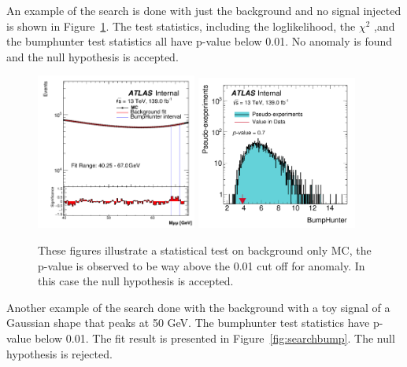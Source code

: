 An example of the search is done with just the background and no signal injected is shown in Figure~\ref{fig:searchnull}. The test statistics, including 
the loglikelihood, the $\chi^{2}$ ,and the bumphunter test statistics all have p-value below 0.01. No anomaly is found and the null hypothesis is accepted.
    
\begin{figure}[!htb]
    \begin{center}

        \includegraphics[width=0.47\textwidth]{figures/chapter_dimuon/Nominal}        
        \includegraphics[width=0.47\textwidth]{figures/chapter_dimuon/bumpHunterStatPlot}
        \caption{
        These figures illustrate a statistical test on background only MC, the p-value is observed to be way above the 0.01 cut off for anomaly. In  this case the null hypothesis is accepted.
        }
    \label{fig:searchnull}
    \end{center}
\end{figure}
\FloatBarrier

Another example of the search done with the background with a toy signal of a Gaussian shape that peaks at 50 GeV. The bumphunter test statistics have p-value below 0.01. The fit result is presented in Figure~\ref{fig:searchbump}. The null hypothesis is rejected.

